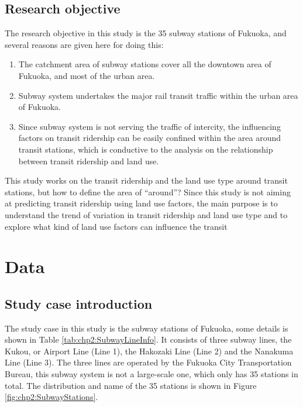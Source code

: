 %
\subsection{Research objective}
%
The research objective in this study is the 35 subway stations of Fukuoka, and several reasons are given here for doing this:

%
\begin{enumerate}
	\setlength{\parskip}{0\baselineskip} %
	\item The catchment area of subway stations cover all the downtown area of Fukuoka, and most of the urban area. 
	\item Subway system undertakes the major rail transit traffic within the urban area of Fukuoka. 
	\item Since subway system is not serving the traffic of intercity, the influencing factors on transit ridership can be easily confined within the area around transit stations, which is conductive to the analysis on the relationship between transit ridership and land use.
	\setlength{\parskip}{0.7\baselineskip} %
\end{enumerate}

%
This study works on the transit ridership and the land use type around transit stations, but how to define the area of “around”? Since this study is not aiming at predicting transit ridership using land use factors, the main purpose is to understand the trend of variation in transit ridership and land use type and to explore what kind of land use factors can influence the transit 



%
\section{Data}
\subsection{Study case introduction}
%
The study case in this study is the subway stations of Fukuoka, some details is shown in Table \ref{tab:chp2:SubwayLineInfo}. It consists of three subway lines, the Kukou, or Airport Line (Line 1), the Hakozaki Line (Line 2) and the Nanakuma Line (Line 3). The three lines are operated by the Fukuoka City Transportation Bureau, this subway system is not a large-scale one, which only has 35 stations in total. The distribution and name of the 35 stations is shown in Figure \ref{fig:chp2:SubwayStations}.

